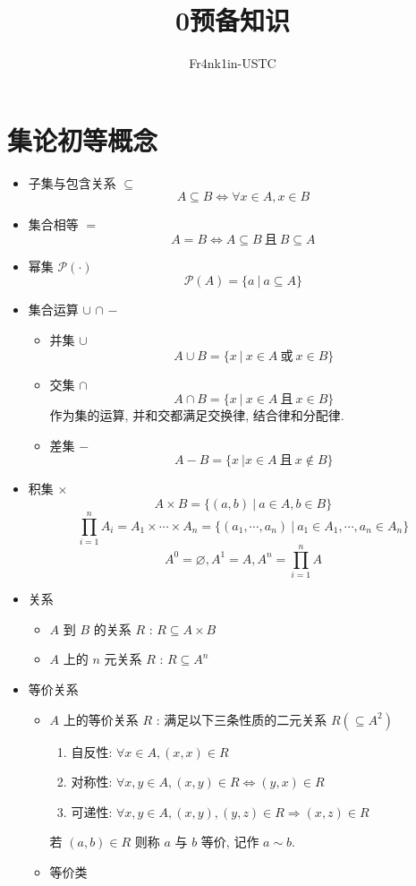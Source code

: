 \documentclass[
    mode=hazy,
    color=blue,
    device=normal,
    lang=cn
]{elegantnote}
\title{0\hspace{.5cm}预备知识}
\author{Fr4nk1in-USTC}
\institute{中国科学技术大学计算机学院}
\date{\zhtoday}
\begin{document}
    \maketitle
    \section{集论初等概念}
    \begin{itemize}
        \item 子集与包含关系 $\subseteq$
        $$
        A\subseteq B \Leftrightarrow \forall x\in A, x\in B
        $$
        \item 集合相等 $=$
        $$
        A=B \Leftrightarrow A\subseteq B\ \text{且}\ B\subseteq A
        $$
        \item 幂集 $\mathcal{P(\cdot)}$
        $$
        \mathcal{P}(A) = \{a\ \vert\ a\subseteq A\}
        $$
        \item 集合运算 $\cup$ $\cap$ $-$
        \begin{itemize}
            \item 并集 $\cup$
            $$
            A\cup B = \{x\ \vert\ x\in A\ \text{或}\ x \in B\}
            $$
            \item 交集 $\cap$
            $$
            A\cap B = \{x\ \vert\ x\in A\ \text{且}\ x \in B\}
            $$
            作为集的运算, 并和交都满足交换律, 结合律和分配律.
            \item 差集 $-$
            $$
            A-B=\{x\ \vert x\in A\ \text{且}\ x \notin B\}
            $$
        \end{itemize}
        \item 积集 $\times$
        $$
        A\times B = \{(a,b)\ \vert\ a\in A,b \in B\}
        $$
        $$
        \prod_{i=1}^n A_i = A_1\times \cdots \times A_n = \{(a_1, \cdots, a_n)\ \vert\ a_1\in A_1,\cdots, a_n\in A_n\}
        $$
        $$
        A^0 = \varnothing  , A^1 = A, A^n = \prod_{i = 1}^n A
        $$
        \item 关系
        \begin{itemize}
            \item $A$ 到 $B$ 的关系 $R$ : $R\subseteq A\times B$
            \item $A$ 上的 $n$ 元关系 $R$ : $R\subseteq A^n$
        \end{itemize}
        \item 等价关系
        \begin{itemize}
            \item $A$ 上的等价关系 $R$ : 满足以下三条性质的二元关系 $R(\subseteq A^2)$
            \begin{enumerate}[label=$\arabic*^\circ$]
                \item 自反性: $\forall x\in A, (x,x)\in R$
                \item 对称性: $\forall x,y\in A, (x,y)\in R\Leftrightarrow (y,x)\in R$
                \item 可递性: $\forall x,y\in A, (x,y), (y,z)\in R\Rightarrow (x,z)\in R$
            \end{enumerate}
            若 $(a,b)\in R$ 则称 $a$ 与 $b$ 等价, 记作 $a\sim b$.
            \item 等价类
            

\end{itemize}
\end{itemize}
\end{document}
